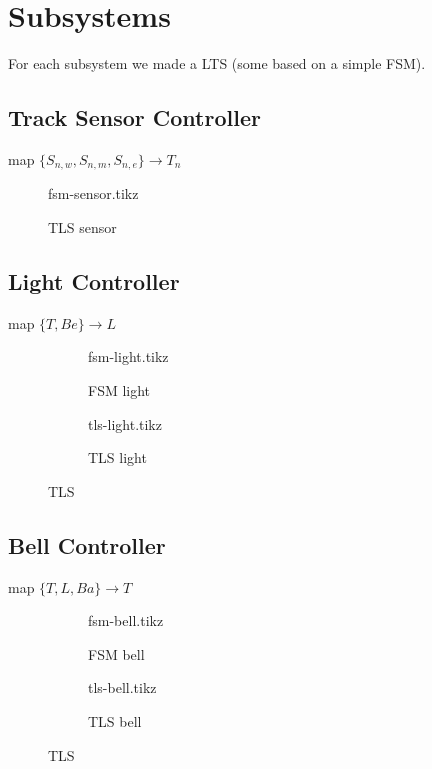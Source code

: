 \documentclass[final]{report}
\begin{document}
\chapter{Subsystems}
For each subsystem we made a LTS (some based on a simple FSM).

\section{Track Sensor Controller}
map $\{S_{n,w},S_{n,m},S_{n,e}\} \rightarrow T_{n}$
	\begin{figure}[H]
		\centering
		{fsm-sensor.tikz}
		\caption{TLS sensor}
		\label{fig:tls-sensor}
	\end{figure}

\section{Light Controller}
map $\{T,Be\} \rightarrow L$
	\begin{figure}[H]
		\centering
			\begin{subfigure}[b]{0.4\textwidth}
		\centering
				{fsm-light.tikz}
				\caption{FSM light}
				\label{fig:fsm-light}
			\end{subfigure}
			\begin{subfigure}[b]{0.4\textwidth}
		\centering
				{tls-light.tikz}
				\caption{TLS light}
				\label{fig:tls-light}
			\end{subfigure}
		\caption{TLS}
		\label{fig:light}
	\end{figure}

\section{Bell Controller}
map $\{T,L,Ba\} \rightarrow T$
	\begin{figure}[H]
		\centering
			\begin{subfigure}[b]{0.4\textwidth}
				{fsm-bell.tikz}
				\caption{FSM bell}
				\label{fig:fsm-bell}
			\end{subfigure}
			\begin{subfigure}[b]{0.4\textwidth}
				{tls-bell.tikz}
				\caption{TLS bell}
				\label{fig:tls-bell}
			\end{subfigure}
		\caption{TLS}
		\label{fig:bell}
	\end{figure}
\end{document}
